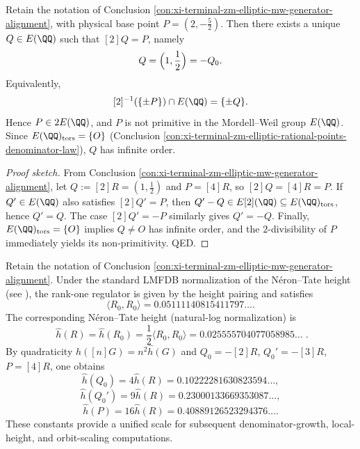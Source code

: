 \begin{conclusion}\label{con:xi-terminal-zm-elliptic-physical-basepoint-halving-uniqueness}
Retain the notation of Conclusion \ref{con:xi-terminal-zm-elliptic-mw-generator-alignment}, with physical base point \(P=(2,-\tfrac52)\).
Then there exists a unique \(Q\in E(\QQ)\) such that \([2]Q=P\), namely
\[
Q=\Bigl(1,\frac12\Bigr)=-Q_0.
\]
Equivalently,
\[
[2]^{-1}(\{\pm P\})\cap E(\QQ)=\{\pm Q\}.
\]
Hence \(P\in 2E(\QQ)\), and \(P\) is not primitive in the Mordell--Weil group \(E(\QQ)\).
Since \(E(\QQ)_{\mathrm{tors}}=\{O\}\) (Conclusion \ref{con:xi-terminal-zm-elliptic-rational-points-denominator-law}), \(Q\) has infinite order.
\end{conclusion}
\begin{proof}[Proof sketch]
From Conclusion \ref{con:xi-terminal-zm-elliptic-mw-generator-alignment}, let \(Q:=[2]R=(1,\tfrac12)\) and \(P=[4]R\), so \([2]Q=[4]R=P\).
If \(Q'\in E(\QQ)\) also satisfies \([2]Q'=P\), then \(Q'-Q\in E[2](\QQ)\subseteq E(\QQ)_{\mathrm{tors}}\), hence \(Q'=Q\).
The case \([2]Q'=-P\) similarly gives \(Q'=-Q\).
Finally, \(E(\QQ)_{\mathrm{tors}}=\{O\}\) implies \(Q\neq O\) has infinite order, and the \(2\)-divisibility of \(P\) immediately yields its non-primitivity. QED.
\end{proof}

\begin{conclusion}\label{con:xi-terminal-zm-elliptic-nt-height-scaling}
Retain the notation of Conclusion \ref{con:xi-terminal-zm-elliptic-mw-generator-alignment}.
Under the standard LMFDB normalization of the N\'eron--Tate height (see \cite{LMFDBEllipticCurve37a1}), the rank-one regulator is given by the height pairing and satisfies
\[
\langle R_0,R_0\rangle=0.05111140815411797\ldots.
\]
The corresponding N\'eron--Tate height (natural-log normalization) is
\[
\boxed{\;
\hat h(R)=\hat h(R_0)=\frac12\langle R_0,R_0\rangle
=0.025555704077058985\ldots\;} .
\]
By quadraticity \(\hat h([n]G)=n^2\hat h(G)\) and \(Q_0=-[2]R\), \(Q_0'=-[3]R\), \(P=[4]R\), one obtains
\[
\hat h(Q_0)=4\hat h(R)=0.10222281630823594\ldots,
\]
\[
\hat h(Q_0')=9\hat h(R)=0.23000133669353087\ldots,
\]
\[
\hat h(P)=16\hat h(R)=0.40889126523294376\ldots.
\]
These constants provide a unified scale for subsequent denominator-growth, local-height, and orbit-scaling computations.
\end{conclusion}


